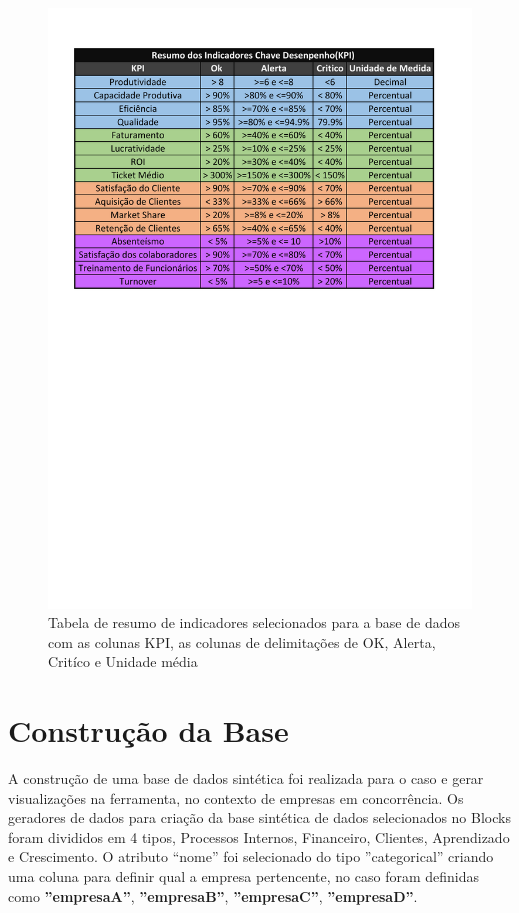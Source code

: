 \documentclass[
	12pt,				%
	openright,			%
	oneside,			%
	a4paper,			%
	english,			%
	brazil				%
	]{abntex2}
\begin{document}
\begin{figure}[h]
	\caption{\label{resumo_Indicadores} Tabela de resumo de indicadores selecionados para a base de dados com as colunas KPI, as colunas de delimitações de OK, Alerta, Critíco e Unidade média
}
	\begin{center}
	    \includegraphics[width=\textwidth,trim={0cm 155mm, 0mm 20mm},clip]{figures/resumoIndicadores- BSC.pdf}
	\end{center}
\end{figure}


\section{Construção da Base}
A construção de uma base de dados sintética foi realizada para o caso e gerar visualizações na ferramenta, no contexto de empresas em concorrência. 
Os geradores de dados para criação da base sintética de dados selecionados no Blocks foram divididos em 4 tipos, Processos Internos, Financeiro, Clientes, Aprendizado e Crescimento.
O atributo “nome” foi selecionado do tipo ''categorical'' criando uma coluna para definir qual a empresa pertencente, no caso foram definidas como \textbf{''empresaA''}, \textbf{''empresaB''},  \textbf{''empresaC''}, \textbf{''empresaD''}.
\end{document}

